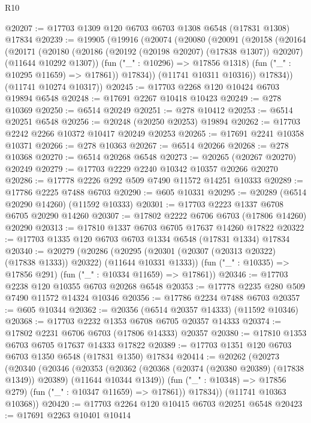 \begin{lexlean}{R10}
\begin{coremodule}
@20207 := @17703 @1309 @120 @6703 @6703 @1308 @6548 (@17831 @1308) @17834
@20239 := @19905
    (@19916
      (@20074
        (@20080
          (@20091
            (@20158
              (@20164
                (@20171
                  (@20180
                    (@20186 (@20192 (@20198 @20207) (@17838 @1307)) @20207)
                    (@11644 @10292 @1307))
                  (fun ("_" : @10296) => @17856 @1318)
                  (fun ("_" : @10295 @11659) => @17861))
                @17834))
            (@11741 @10311 @10316))
          @17834))
      (@11741 @10274 @10317))
@20245 := @17703 @2268 @120 @10424 @6703 @19894 @6548
@20248 := @17691 @2267 @10418 @10423
@20249 := @278 @10369
@20250 := @6514 @20249
@20251 := @278 @10412
@20253 := @6514 @20251 @6548
@20256 := @20248 (@20250 @20253) @19894
@20262 := @17703 @2242 @2266 @10372 @10417 @20249 @20253
@20265 := @17691 @2241 @10358 @10371
@20266 := @278 @10363
@20267 := @6514 @20266
@20268 := @278 @10368
@20270 := @6514 @20268 @6548
@20273 := @20265 (@20267 @20270) @20249
@20279 := @17703 @2229 @2240 @10342 @10357 @20266 @20270
@20286 := @17778 @2226 @292 @509 @7490 @11572 @14251 @10333
@20289 := @17786 @2225 @7488 @6703
@20290 := @605 @10331
@20295 := @20289 (@6514 @20290 @14260) (@11592 @10333)
@20301 := @17703 @2223 @1337 @6708 @6705 @20290 @14260
@20307 := @17802 @2222 @6706 @6703 (@17806 @14260) @20290
@20313 := @17810 @1337 @6703 @6705 @17637 @14260 @17822
@20322 := @17703 @1335 @120 @6703 @6703 @1334 @6548 (@17831 @1334) @17834
@20340 := @20279
    (@20286
      (@20295 (@20301 (@20307 (@20313 @20322) (@17838 @1333)) @20322) (@11644 @10331 @1333))
      (fun ("_" : @10335) => @17856 @291)
      (fun ("_" : @10334 @11659) => @17861))
@20346 := @17703 @2238 @120 @10355 @6703 @20268 @6548
@20353 := @17778 @2235 @280 @509 @7490 @11572 @14324 @10346
@20356 := @17786 @2234 @7488 @6703
@20357 := @605 @10344
@20362 := @20356 (@6514 @20357 @14333) (@11592 @10346)
@20368 := @17703 @2232 @1353 @6708 @6705 @20357 @14333
@20374 := @17802 @2231 @6706 @6703 (@17806 @14333) @20357
@20380 := @17810 @1353 @6703 @6705 @17637 @14333 @17822
@20389 := @17703 @1351 @120 @6703 @6703 @1350 @6548 (@17831 @1350) @17834
@20414 := @20262
    (@20273
      (@20340
        (@20346
          (@20353
            (@20362 (@20368 (@20374 (@20380 @20389) (@17838 @1349)) @20389) (@11644 @10344 @1349))
            (fun ("_" : @10348) => @17856 @279)
            (fun ("_" : @10347 @11659) => @17861))
          @17834))
      (@11741 @10363 @10368))
@20420 := @17703 @2264 @120 @10415 @6703 @20251 @6548
@20423 := @17691 @2263 @10401 @10414

\end{coremodule}
\end{lexlean}
